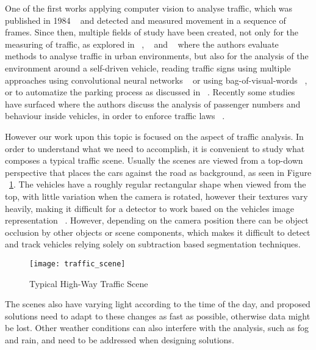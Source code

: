 One of the first works applying computer vision to analyse traffic, which was published in 1984 ~\cite{dickinson_image_1984} and detected and measured movement in a sequence of frames. Since then, multiple fields of study have been created, not only for the measuring of traffic, as explored in ~\cite{lira_computer-vision_2016}, ~\cite{buch_review_2011} and ~\cite{hashmi_analysis_2012} where the authors evaluate methods to analyse traffic in urban environments, but also for the analysis of the environment around a self-driven vehicle, reading traffic signs using multiple approaches using convolutional neural networks ~\cite{soendoro_traffic_2011} or using bag-of-visual-words ~\cite{supriyanto_unsupervised_2016}, or to automatize the parking process as discussed in ~\cite{hammoudi_self-driven_2016}. Recently some studies have surfaced where the authors discuss the analysis of passenger numbers and behaviour inside vehicles, in order to enforce traffic laws ~\cite{loce_detection_2017-1}.

However our work upon this topic is focused on the aspect of traffic analysis. In order to understand what we need to accomplish, it is convenient to study what composes a typical traffic scene. Usually the scenes are viewed from a top-down perspective that places the cars against the road as background, as seen in Figure ~\ref{fig:hh_traffic}. The vehicles have a roughly regular rectangular shape when viewed from the top, with little variation when the camera is rotated, however their textures vary heavily, making it difficult for a detector to work based on the vehicles image representation ~\cite{badenas_applying_1998}. However, depending on the camera position there can be object occlusion by other objects or scene components, which makes it difficult to detect and track vehicles relying solely on subtraction based segmentation techniques.

\begin{figure}[h]
  \begin{center}
    \leavevmode
    \texttt{[image: traffic\_scene]}
    \caption{Typical High-Way Traffic Scene}
    \label{fig:hh_traffic}
  \end{center}
\end{figure}

The scenes also have varying light according to the time of the day, and proposed solutions need to adapt to these changes as fast as possible, otherwise data might be lost. Other weather conditions can also interfere with the analysis, such as fog and rain, and need to be addressed when designing solutions.

